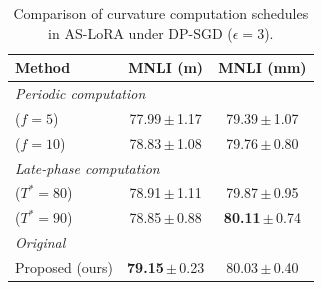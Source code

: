 \begin{table}
\vspace{-13pt}
\centering
\scriptsize
\setlength{\tabcolsep}{2pt}
\renewcommand{\arraystretch}{1.05}
\newcommand{\std}[1]{\,{\tiny$\pm$}\,\tiny #1}
\caption{
    Comparison of curvature computation schedules in AS-LoRA under DP-SGD ($\epsilon=3$).
}
\label{tab:score_computation}
\begin{tabular}{lcc}
\toprule
\textbf{Method} & \textbf{MNLI (m)} & \textbf{MNLI (mm)} \\
\midrule
\multicolumn{3}{l}{\textit{Periodic computation}} \\
($f{=}5$)   & 77.99\std{1.17} & 79.39\std{1.07} \\
($f{=}10$)  & 78.83\std{1.08} & 79.76\std{0.80} \\
\midrule
\multicolumn{3}{l}{\textit{Late-phase computation}} \\
($T^*{=}80$) & 78.91\std{1.11} & 79.87\std{0.95} \\
($T^*{=}90$) & 78.85\std{0.88} & \textbf{80.11}\std{0.74} \\
\midrule
\multicolumn{3}{l}{\textit{Original}} \\
Proposed (ours) & \textbf{79.15}\std{0.23} & 80.03\std{0.40} \\
\bottomrule
\end{tabular}
\vspace{-20pt}
\end{table}


